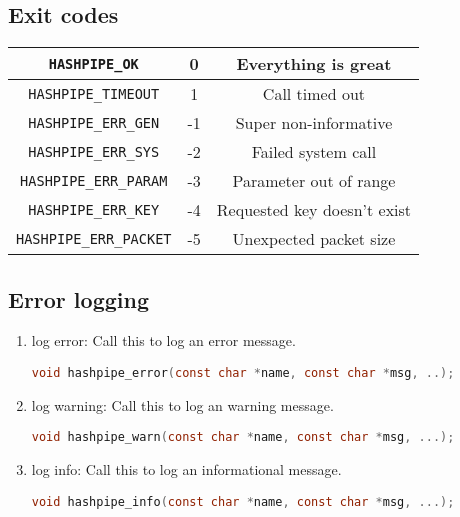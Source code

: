 \documentclass[12pt]{article}
\def\clst{\lstinline[basicstyle=\ttfamily,breaklines=true,language=C]}
\begin{document}
\subsection{Exit codes}
\vspace{1cm}
\begin{center}
\begin{tabular}{|c|c|c|}
\hline
{\tt HASHPIPE\_OK}          &  0 & Everything is great\\[0.25cm] 
\hline
{\tt HASHPIPE\_TIMEOUT}     &  1 & Call timed out \\[0.25cm]
\hline
{\tt HASHPIPE\_ERR\_GEN}    & -1 & Super non-informative \\[0.25cm]
\hline
{\tt HASHPIPE\_ERR\_SYS}    & -2 & Failed system call \\[0.25cm]
\hline
{\tt HASHPIPE\_ERR\_PARAM}  & -3 & Parameter out of range \\[0.25cm]
\hline
{\tt HASHPIPE\_ERR\_KEY}    & -4 & Requested key doesn't exist \\[0.25cm]
\hline
{\tt HASHPIPE\_ERR\_PACKET} & -5 & Unexpected packet size \\[0.25cm]
\hline
\end{tabular}
\end{center}

\subsection{Error logging}
\begin{enumerate}
\item log error: Call this to log an error message.

\clst{void hashpipe_error(const char *name, const char *msg, ..);}

\item log warning: Call this to log an warning message.

\clst{void hashpipe_warn(const char *name, const char *msg, ...);}

\item log info: Call this to log an informational message.

\clst{void hashpipe_info(const char *name, const char *msg, ...);}
\end{enumerate}
\end{document}

